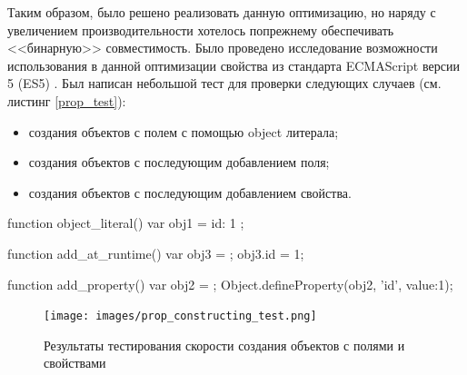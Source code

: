 \begin{code}
\end{code}

Таким образом, было решено реализовать данную оптимизацию, но наряду с увеличением производительности хотелось попрежнему обеспечивать <<бинарную>> совместимость. Было проведено исследование возможности использования в данной оптимизации свойства из стандарта ECMAScript версии 5 (ES5) \cite{ES5}. Был написан небольшой тест для проверки следующих случаев (см. листинг \ref{prop_test}):
\begin{itemize}
	\item создания объектов с полем с помощью object литерала;
	\item создания объектов с последующим добавлением поля;
	\item создания объектов с последующим добавлением свойства.
\end{itemize}

\begin{code}
\begin{JavaScript}[caption=Тест производительности для сравнения скорости создания объектов с полем и свойством, label=prop_test]
function object_literal() {
	var obj1 = { id: 1 };
}

function add_at_runtime() {
    var obj3 = {};
    obj3.id = 1;
}

function add_property() {
    var obj2 = {};
    Object.defineProperty(obj2, 'id', {value:1});
}   
\end{JavaScript}
\end{code}

\begin{figure}[ht!]
\centering
\texttt{[image: images/prop\_constructing\_test.png]}
\caption{Результаты тестирования скорости создания объектов с полями и свойствами}
\label{prop_constructing_test}
\end{figure}

